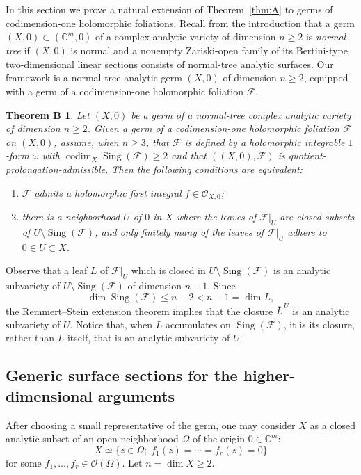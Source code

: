 \documentclass[11pt,twoside]{amsart}
\newcommand{\C}{\mathbb C}
\newcommand{\OO}{\mathcal O}
\newcommand{\F}{\mathcal F}
\DeclareMathOperator{\Sing}{Sing}
\DeclareMathOperator{\codim}{codim}
\newtheorem*{teo2}{Theorem B}
\theoremstyle{definition}
\begin{document}
In this section we prove a natural extension of Theorem~\ref{thm:A} to
germs of codimension-one holomorphic foliations.
Recall from the introduction that
a germ $(X,0)\subset(\C^m,0)$ of a complex analytic variety of dimension
$n\geq2$ is \textit{normal-tree} if $(X,0)$ is normal and a nonempty
Zariski-open family of its
Bertini-type two-dimensional linear sections consists of normal-tree
analytic surfaces. Our framework is a normal-tree analytic germ $(X,0)$ of
dimension $n\geq2$, equipped with a germ of a codimension-one holomorphic
foliation $\F$.

\begin{teo2}\normalfont
Let $(X,0)$ be a germ of a normal-tree complex analytic variety of dimension $n\geq2$. Given a germ of a codimension-one holomorphic foliation $\F$ on $(X,0)$, assume, when $n\geq3$, that $\F$ is defined by a holomorphic integrable $1$-form $\omega$ with $\codim_X\Sing(\F)\geq2$ and that $((X,0),\F)$ is quotient-prolongation-admissible. Then the following conditions are equivalent:
\begin{enumerate}
\item[(i)] $\F$ admits a holomorphic first integral $f\in\OO_{X,0}$;
\item[(ii)] there is a neighborhood $U$ of $0$ in $X$ where the leaves of $\F|_U$ are closed subsets of $U\setminus\Sing(\F)$, and only finitely many of the leaves of $\F|_U$ adhere to $0\in U\subset X$.
\end{enumerate}
\end{teo2}

Observe that a leaf $L$ of $\F|_U$ which is closed in
$U\setminus\Sing(\F)$ is an analytic subvariety of
$U\setminus\Sing(\F)$ of dimension $n-1$. Since
\[
\dim\Sing(\F)\leq n-2<n-1=\dim L,
\]
the Remmert--Stein extension theorem implies that the closure
$\overline L^{\,U}$ is an analytic subvariety of $U$. Notice that, when
$L$ accumulates on $\Sing(\F)$, it is its closure, rather than $L$
itself, that is an analytic subvariety of $U$.

\subsection{Generic surface sections for the higher-dimensional arguments}

After choosing a small representative of the germ, one may consider $X$ as a closed analytic subset of an open neighborhood $\Omega$ of the origin $0\in\C^m$:
\[
X\simeq\{z\in\Omega;\;f_1(z)=\cdots=f_r(z)=0\}
\]
for some $f_1,\ldots,f_r\in\OO(\Omega)$. Let $n=\dim X\geq2$.
\end{document}
